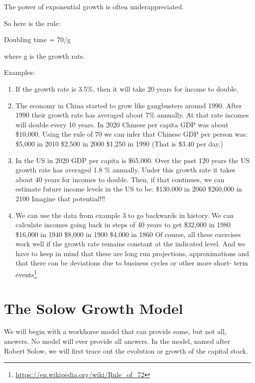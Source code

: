 \documentclass[
]{book}
\begin{document}
The power of exponential growth is often underappreciated.

So here is the rule:

Doubling time = 70/g

where g is the growth rate.

Examples:

\begin{enumerate}
\def\labelenumi{\arabic{enumi}.}
\item
  If the growth rate is 3.5\%. then it will take 20 years for income to double.
\item
  The economy in China started to grow like gangbusters around 1990. After 1990 their growth rate has averaged about 7\% annually. At that rate incomes will double every 10 years. In 2020 Chinese per capita GDP was about \$10,000. Using the rule of 70 we can infer that Chinese GDP per person was:
  \$5,000 in 2010
  \$2,500 in 2000
  \$1,250 in 1990 (That is \$3.40 per day.)
\item
  In the US in 2020 GDP per capita is \$65,000. Over the past 120 years the US growth rate has averaged 1.8 \% annually. Under this growth rate it takes about 40 years for incomes to double. Then, if that continues, we can estimate future income levels in the US to be:
  \$130,000 in 2060
  \$260,000 in 2100
  Imagine that potential!!!
\item
  We can use the data from example 3 to go backwards in history. We can calculate incomes going back in steps of 40 years to get
  \$32,000 in 1980
  \$16,000 in 1940
  \$8,000 in 1900
  \$4,000 in 1860
  Of course, all these exercises work well if the growth rate remains constant at the indicated level. And we have to keep in mind that these are long run projections, approximations and that there can be deviations due to business cycles or other more short- term events\footnote{\url{https://en.wikipedia.org/wiki/Rule_of_72}}
\end{enumerate}

\hypertarget{the-solow-growth-model}{%
\section{The Solow Growth Model}\label{the-solow-growth-model}}

We will begin with a workhorse model that can provide some, but not all, answers. No model will ever provide all answers. In the model, named after Robert Solow, we will first trace out the evolution or growth of the capital stock.
\end{document}
